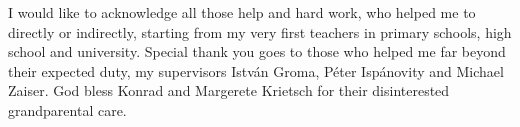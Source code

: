 
\begin{acknowledgements}      


I would like to acknowledge all those help and hard work, who helped me to directly or indirectly, starting from my very first teachers in primary schools, high school and university. Special thank you goes to those who helped me far beyond their expected duty, my supervisors István Groma, Péter Ispánovity and Michael Zaiser. God bless Konrad and Margerete Krietsch for their disinterested grandparental care.


\end{acknowledgements}
